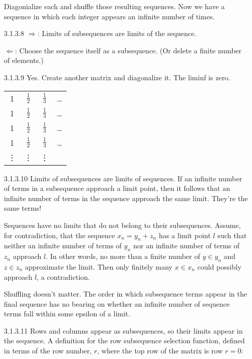 \documentclass{article}
\begin{document}
\begin{enumerate}
  Diagonialize each and shuffle those resulting sequences. 
  Now we have a sequence in which each integer appears an infinite
  number of times. 
\item[]
\item[3.1.3.8]
  $\Rightarrow$: Limits of subsequences are limits of the sequence. 

  $\Leftarrow$: Choose the sequence itself as a subsequence.
    (Or delete a finite number of elements.)
\item[]
\item[3.1.3.9]
  Yes. Create another matrix and diagonalize it. The liminf is zero.
\item[]
  \begin{tabular}{c c c c}
   1 & $\frac{1}{2}$ & $\frac{1}{3}$ & \ldots \\
   1 & $\frac{1}{2}$ & $\frac{1}{3}$ & \ldots \\
   1 & $\frac{1}{2}$ & $\frac{1}{3}$ & \ldots \\
   1 & $\frac{1}{2}$ & $\frac{1}{3}$ & \ldots \\
   \vdots & \vdots & \vdots & \\
  \end{tabular} 
\item[]
\item[3.1.3.10]
  Limits of subsequences are limits of sequences. If an infinite
  number of terms in a subsequence approach a limit point, then it 
  follows that an infinite number of terms in the sequence approach the
  same limit. They're the same terms!

  Sequences have no limits that do not belong to their subsequences. 
  Assume, for contradiction, that the sequence $x_n = y_n + z_n$ has 
  a limit point $l$ such that neither an infinite number of terms 
  of $y_n$ nor an infinite number of terms of $z_n$ approach $l$. 
  In other words, no more than a finite number of $y\in y_n$ and 
  $z \in z_n$ approximate the limit. Then only finitely many $x\in x_n$
  could possibly approach $l$, a contradiction.

  Shuffling doesn't matter. The order in which subsequence terms appear
  in the final sequence has no bearing on whether an infinite number of 
  sequence terms fall within some epsilon of a limit.
\item[]
\item[3.1.3.11]
  Rows and columns appear as subsequences, so their limits appear in the
  sequence. A definition for the row subsequence selection function, 
  defined in terms of the row number, $r$, where the top row of the matrix
  is row $r=0$:
  

\end{enumerate}
\end{document}
